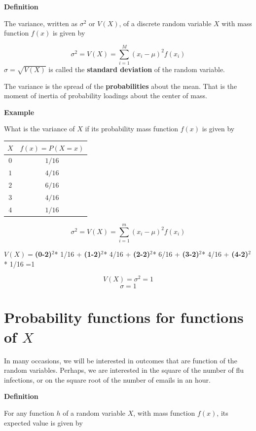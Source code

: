 \documentclass[
]{book}
\begin{document}
\textbf{Definition}

The variance, written as \(\sigma^2\) or \(V(X)\), of a discrete random variable \(X\) with mass function \(f(x)\) is given by

\[\sigma^2 = V(X)= \sum_{i=1}^M (x_i-\mu)^2 f(x_i)\]
\(\sigma=\sqrt{V(X)}\) is called the \textbf{standard deviation} of the random variable.

The variance is the spread of the \textbf{probabilities} about the mean. That is the moment of inertia of probability loadings about the center of mass.

\textbf{Example}

What is the variance of \(X\) if its probability mass function \(f(x)\) is given by

\begin{longtable}[]{@{}cc@{}}
\toprule\noalign{}
\(X\) & \(f(x)=P(X=x)\) \\
\midrule\noalign{}
\endhead
\bottomrule\noalign{}
\endlastfoot
\(0\) & \(1/16\) \\
\(1\) & \(4/16\) \\
\(2\) & \(6/16\) \\
\(3\) & \(4/16\) \\
\(4\) & \(1/16\) \\
\end{longtable}

\[\sigma^2 =V(X)=\sum_{i=1}^m (x_i-\mu)^2 f(x_i)\]

\(V(X)=\)\textbf{(0-2)}\(^2\)* 1/16 + \textbf{(1-2)}\(^2\)* 4/16 + \textbf{(2-2)}\(^2\)* 6/16 + \textbf{(3-2)}\(^2\)* 4/16 + \textbf{(4-2)}\(^2\)* 1/16 =1

\[V(X)=\sigma^2=1\]
\[\sigma=1\]

\hypertarget{probability-functions-for-functions-of-x}{%
\section{\texorpdfstring{Probability functions for functions of \(X\)}{Probability functions for functions of X}}\label{probability-functions-for-functions-of-x}}

In many occasions, we will be interested in outcomes that are function of the random variables. Perhaps, we are interested in the square of the number of flu infections, or on the square root of the number of emails in an hour.

\textbf{Definition}

For any function \(h\) of a random variable \(X\), with mass function \(f(x)\), its expected value is given by
\end{document}
